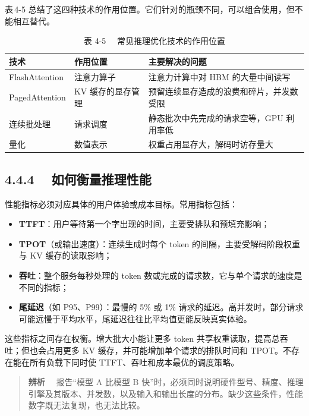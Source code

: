 \documentclass{article}
\begin{document}
表\,4-5 总结了这四种技术的作用位置。它们针对的瓶颈不同，可以组合使用，但不能相互替代。

\begin{table}[htbp]
\centering
\caption{表 4-5　 常见推理优化技术的作用位置}

\begin{tabular}{l l l}
\toprule
技术 & 作用位置 & 主要解决的问题 \\
\midrule
FlashAttention & 注意力算子 & 注意力计算中对 HBM 的大量中间读写 \\
PagedAttention & KV 缓存的显存管理 & 预留连续显存造成的浪费和碎片，并发数受限 \\
连续批处理 & 请求调度 & 静态批次中先完成的请求空等，GPU 利用率低 \\
量化 & 数值表示 & 权重占用显存大，解码时访存量大 \\
\bottomrule
\end{tabular}
\end{table}

\subsection*{4.4.4　 如何衡量推理性能}


性能指标必须对应具体的用户体验或成本目标。常用指标包括：
\begin{itemize}
  \item \textbf{TTFT}：用户等待第一个字出现的时间，主要受排队和预填充影响；
  \item \textbf{TPOT}（或输出速度）：连续生成时每个 token 的间隔，主要受解码阶段权重与 KV 缓存的读取影响；
  \item \textbf{吞吐}：整个服务每秒处理的 token 数或完成的请求数，它与单个请求的速度是不同的指标；
  \item \textbf{尾延迟}（如 P95、P99）：最慢的 5\% 或 1\% 请求的延迟。高并发时，部分请求可能远慢于平均水平，尾延迟往往比平均值更能反映真实体验。
\end{itemize}

这些指标之间存在权衡。增大批大小能让更多 token 共享权重读取，提高总吞吐；但也会占用更多 KV 缓存，并可能增加单个请求的排队时间和 TPOT。不存在能在所有负载下同时使 TTFT、吞吐和成本最优的调度策略。

\begin{quote}
\textbf{辨析}　 
报告“模型 A 比模型 B 快”时，必须同时说明硬件型号、精度、推理引擎及其版本、并发数，以及输入和输出长度的分布。缺少这些条件，性能数字既无法复现，也无法比较。
\end{quote}
\end{document}
